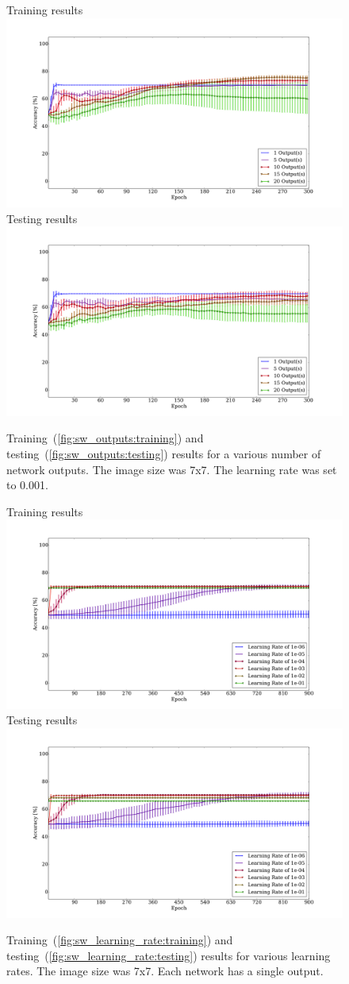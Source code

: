 \documentclass[10pt,journal]{IEEEtran}
\newcommand{\subfig}[1]{~(\ref{#1})}
\begin{document}
				\begin{figure}[t!]
					\captionsetup[subfigure]{position=b}
					\centering
					\hfill
					\subcaptionbox
					{
						Training results
						\label{fig:sw_outputs:training}
					}
					{\includegraphics[width=0.49\linewidth]{sw_outputs_training}}
					\hfill
					\subcaptionbox
					{
						Testing results
						\label{fig:sw_outputs:testing}
					}
					{\includegraphics[width=0.49\linewidth]{sw_outputs_testing}}
					\hfill
					\caption{Training\subfig{fig:sw_outputs:training} and testing\subfig{fig:sw_outputs:testing} results for a various number of network outputs. The image size was 7x7. The learning rate was set to 0.001.}
					\label{fig:sw_outputs}
				\end{figure}
				
				\begin{figure}[t!]
					\captionsetup[subfigure]{position=b}
					\centering
					\hfill
					\subcaptionbox
					{
						Training results
						\label{fig:sw_learning_rate:training}
					}
					{\includegraphics[width=0.49\linewidth]{sw_learning_rate_training}}
					\hfill
					\subcaptionbox
					{
						Testing results
						\label{fig:sw_learning_rate:testing}
					}
					{\includegraphics[width=0.49\linewidth]{sw_learning_rate_testing}}
					\hfill
					\caption{Training\subfig{fig:sw_learning_rate:training} and testing\subfig{fig:sw_learning_rate:testing} results for various learning rates. The image size was 7x7. Each network has a single output.}
					\label{fig:sw_learning_rate}
				\end{figure}
			
\end{document}
